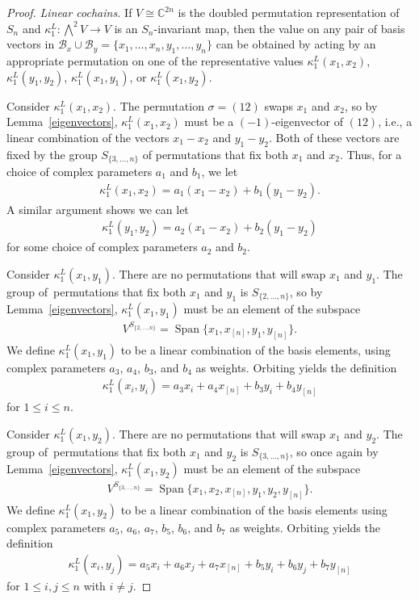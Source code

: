 \documentclass[10pt,a4paper]{amsart}
\numberwithin{equation}{section}
\DeclareMathOperator{\Span}{Span}
\begin{document}
\begin{proof}
\textit{Linear cochains.}
If $V\cong \mathbb{C}^{2n}$ is the doubled permutation representation of $S_n$
and $\kappa^L_1\colon \bigwedge^2 V\to V$ is an $S_n$-invariant map,
then the value on any pair of basis vectors in $\mathcal{B}_x \cup \mathcal{B}_y=\{x_1,\dots,x_n,y_1,\dots,y_n\}$
can be obtained by acting by an appropriate permutation on one of the representative values
$\kappa^L_1(x_1,x_2)$, $\kappa^L_1(y_1,y_2)$, $\kappa^L_1(x_1,y_1)$, or $\kappa^L_1(x_1,y_2)$.

Consider $\kappa^L_1(x_1,x_2)$. The permutation $\sigma=(12)$ swaps $x_1$ and $x_2$, so by Lemma~\ref{eigenvectors}, $\kappa^L_1(x_1,x_2)$ must be a $(-1)$-eigenvector of $(12)$, i.e.,
a linear combination of the vectors $x_1-x_2$ and $y_1-y_2$. Both of these vectors are fixed by the group $S_{\{3,\ldots,n\}}$ of permutations that fix
both $x_1$ and $x_2$. Thus, for a choice of complex parameters $a_1$ and $b_1$,
we let
\begin{gather*}
\kappa^L_1(x_1,x_2)=a_1(x_1-x_2)+b_1(y_1-y_2).
\end{gather*}
A similar argument shows we can let
\begin{gather*}
\kappa^L_1(y_1,y_2)=a_2(x_1-x_2)+b_2(y_1-y_2)
\end{gather*}
for some choice of complex parameters $a_2$ and $b_2$.

Consider $\kappa^L_1(x_1,y_1)$. There are no permutations that will swap $x_1$ and $y_1$. The group of~per\-mu\-tations that fix both $x_1$ and $y_1$ is $S_{\{2,\ldots,n\}}$, so by Lemma~\ref{eigenvectors},
$\kappa^L_1(x_1,y_1)$ must be an element of the subspace
\begin{gather*}
V^{S_{\{2,\ldots,n\}}}=\Span\big\{x_1, x_{[n]}, y_1, y_{[n]}\big\}.
\end{gather*}
We define $\kappa^L_1(x_1,y_1)$ to be a linear combination of the basis elements, using complex parameters $a_3$, $a_4$, $b_3$, and $b_4$ as weights.
Orbiting yields the definition
\begin{gather*}
\kappa^L_1(x_i,y_i)=a_3x_i+a_4x_{[n]}+b_3y_i+b_4y_{[n]}
\end{gather*}
for $1\leq i\leq n$.

Consider $\kappa^L_1(x_1,y_2)$. There are no permutations that will swap $x_1$ and $y_2$. The group of~per\-mu\-tations that fix both $x_1$ and $y_2$ is $S_{\{3,\ldots,n\}}$, so once again by Lemma~\ref{eigenvectors}, $\kappa^L_1(x_1,y_2)$ must be an element of
the subspace
\begin{gather*}
V^{S_{\{3,\ldots,n\}}}=\Span\big\{x_1,x_2, x_{[n]}, y_1, y_2, y_{[n]}\big\}.
\end{gather*}
We define $\kappa^L_1(x_1,y_2)$ to be a linear combination of the basis elements using complex parameters $a_5$, $a_6$, $a_7$, $b_5$, $b_6$, and $b_7$ as weights.
Orbiting yields the definition
\begin{gather*}
\kappa^L_1(x_i,y_j)=a_5x_i+a_6x_j+a_7x_{[n]}+b_5y_i+b_6y_j+b_7y_{[n]}
\end{gather*}
for $1\leq i,j\leq n$ with $i\neq j$.


\end{proof}
\end{document}
